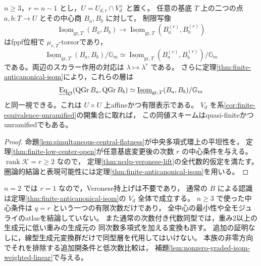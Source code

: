 \begin{corollary}\label{cor:finite-full-graded-recognition}
$n\ge3$，$r=n-1$ とし，$U=U_{d,r}\cap V_d^\times$ と置く。
任意の基底 $T$ 上の二つの点 $a,b:T\to U$ とその中心商 $B_a,B_b$ に対して，
制限写像
\[
 \underline{\operatorname{Isom}}_{\mathrm{gr},T}(B_a,B_b)
 \longrightarrow
 \underline{\operatorname{Isom}}_{\mathrm{gr},T}
           (B_a^{(r)},B_b^{(r)})
\]
はfppf位相で $\mu_{r,T}$-torsorであり，
\[
 \underline{\operatorname{Isom}}_{\mathrm{gr},T}(B_a,B_b)/\mathbb G_m
  \simeq
 \underline{\operatorname{Isom}}_{\mathrm{gr},T}
           (B_a^{(r)},B_b^{(r)})/\mathbb G_m
\]
である。両辺のスカラー作用の対応は $\lambda\mapsto\lambda^r$ である。
さらに定理\ref{thm:finite-anticanonical-isom}により，これらの層は
\begin{equation}\label{eq:finite-full-graded-recognition}
 \underline{\operatorname{Eq}}_{\mathcal O}(\operatorname{QGr} B_a,\operatorname{QGr} B_b)
 \simeq\underline{\operatorname{Isom}}_{\mathrm{gr},T}(B_a,B_b)/\mathbb G_m
\end{equation}
と同一視できる。これは $U\times U$ 上affineかつ有限表示である。
$V_d$ を系\ref{cor:finite-equivalence-unramified}の開集合に取れば，
この同値スキームはquasi-finiteかつunramifiedでもある。
\end{corollary}
\begin{proof}
命題\ref{lem:simultaneous-central-flatness}が中央多項式環上の平坦性を，
定理\ref{thm:finite-low-center-open}が任意基底変更後の次数 $r$ の中心条件を与える。
$\operatorname{rank}\mathcal K=r\ge2$ なので，
定理\ref{thm:ncdp-veronese-lift}の全代数的仮定を満たす。
圏論的結論と表現可能性には定理\ref{thm:finite-anticanonical-isom}を用いる。
\end{proof}

\begin{remark}
$n=2$ では $r=1$ なので，Veronese持上げは不要であり，
通常の $B$ による認識は定理\ref{thm:finite-anticanonical-isom}の $V_d$ 全体で成立する。
$n\ge3$ で使った中心条件は $q=r$ という一つの有限次数だけであり，
全中心の最小性や全モジュライのatlasを結論していない。
また通常の次数付き代数同型では，重み2以上の生成元に低い重みの生成元の
同次数多項式を加える変換も許す。
追加の証明なしに，線型生成元変換群だけで同型層を代用してはいけない。
本族の非零方向でそれを排除する追加開条件と低次数比較は，
補題\ref{lem:nonzero-graded-isom-weighted-linear}で与える。
\end{remark}
